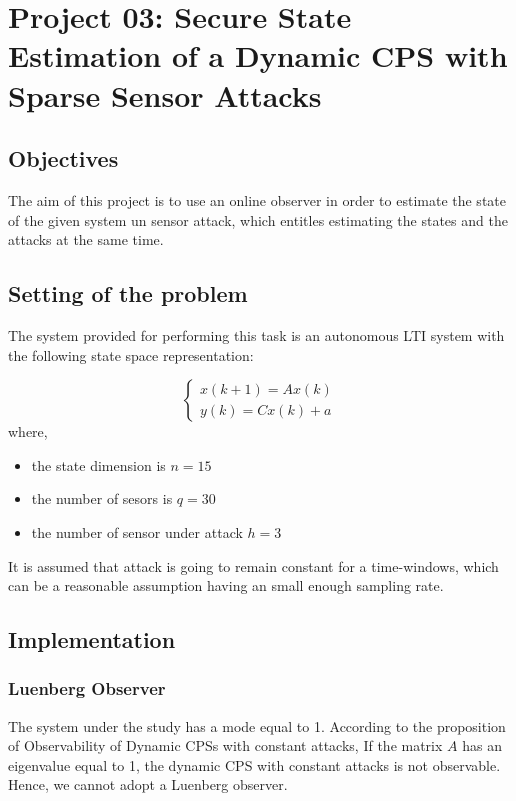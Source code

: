 \chapter{Project 03: Secure State Estimation of a Dynamic CPS with Sparse Sensor Attacks}

\section{Objectives}
The aim of this project is to use an online observer in order to estimate the state of the given system un sensor attack, which entitles estimating the states and the attacks at the same time.

\section{Setting of the problem}
The system provided for performing this task is an autonomous LTI system with the following state space representation:

\begin{equation}
	\begin{cases}
		x(k+1) = A x(k) \\
		y(k) = C x(k) + a
	\end{cases}
\end{equation}
where,
\begin{itemize}
	\item the state dimension is $n = 15$
	\item the number of sesors is $q = 30$
	\item the number of sensor under attack $h = 3$
\end{itemize}

It is assumed that attack is going to remain constant for a time-windows, which can be a reasonable assumption having an small enough sampling rate.

\section{Implementation}
\subsection{Luenberg Observer}
The system under the study has a mode equal to 1. According to the proposition of Observability of Dynamic CPSs with constant attacks, If the matrix $A$ has an eigenvalue equal to 1, the dynamic CPS with constant attacks is not observable. Hence, we cannot adopt a Luenberg observer.

